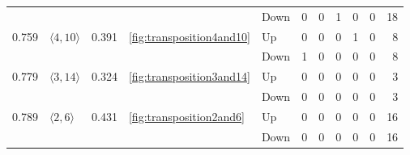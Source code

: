 \documentclass{article}
\begin{document}
\begin{center}
\begin{tabular}{lllllrrrrrr}
 &  &  &  & Down & 0 & 0 & 1 & 0 & 0 & 18 \\
\cline{1-11} \cline{2-11} \cline{3-11} \cline{4-11}
\multirow[t]{2}{*}{0.759} & \multirow[t]{2}{*}{$\langle4, 10\rangle$} & \multirow[t]{2}{*}{0.391} & \multirow[t]{2}{*}{\ref{fig:transposition4and10}} & Up & 0 & 0 & 0 & 1 & 0 & 8 \\
 &  &  &  & Down & 1 & 0 & 0 & 0 & 0 & 8 \\
\cline{1-11} \cline{2-11} \cline{3-11} \cline{4-11}
\multirow[t]{2}{*}{0.779} & \multirow[t]{2}{*}{$\langle3, 14\rangle$} & \multirow[t]{2}{*}{0.324} & \multirow[t]{2}{*}{\ref{fig:transposition3and14}} & Up & 0 & 0 & 0 & 0 & 0 & 3 \\
 &  &  &  & Down & 0 & 0 & 0 & 0 & 0 & 3 \\
\cline{1-11} \cline{2-11} \cline{3-11} \cline{4-11}
\multirow[t]{2}{*}{0.789} & \multirow[t]{2}{*}{$\langle2, 6\rangle$} & \multirow[t]{2}{*}{0.431} & \multirow[t]{2}{*}{\ref{fig:transposition2and6}} & Up & 0 & 0 & 0 & 0 & 0 & 16 \\
 &  &  &  & Down & 0 & 0 & 0 & 0 & 0 & 16 \\
\cline{1-11} \cline{2-11} \cline{3-11} \cline{4-11}
\bottomrule
\end{tabular}


\end{center}
\end{document}
